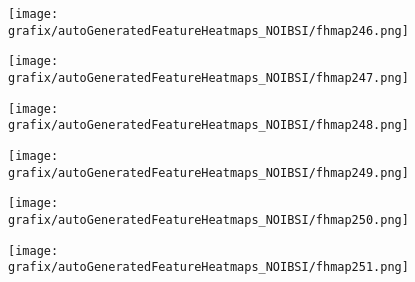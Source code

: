 \hspace{\hsp} 
\begin{subfigure}{\wid\textwidth} 
    \centering 
    \caption{\tiny \sffamily {}} 
    \vspace{\vsp} 
    \texttt{[image: grafix/autoGeneratedFeatureHeatmaps\_NOIBSI/fhmap246.png]} 
\end{subfigure} 
\hspace{\hsp} 
\begin{subfigure}{\wid\textwidth} 
    \centering 
    \caption{\tiny \sffamily {}} 
    \vspace{\vsp} 
    \texttt{[image: grafix/autoGeneratedFeatureHeatmaps\_NOIBSI/fhmap247.png]} 
\end{subfigure} 
\hspace{\hsp} 
\begin{subfigure}{\wid\textwidth} 
    \centering 
    \caption{\tiny \sffamily {}} 
    \vspace{\vsp} 
    \texttt{[image: grafix/autoGeneratedFeatureHeatmaps\_NOIBSI/fhmap248.png]} 
\end{subfigure} 
\hspace{\hsp} 
\begin{subfigure}{\wid\textwidth} 
    \centering 
    \caption{\tiny \sffamily {}} 
    \vspace{\vsp} 
    \texttt{[image: grafix/autoGeneratedFeatureHeatmaps\_NOIBSI/fhmap249.png]} 
\end{subfigure} 
\hspace{\hsp} 
\begin{subfigure}{\wid\textwidth} 
    \centering 
    \caption{\tiny \sffamily {}} 
    \vspace{\vsp} 
    \texttt{[image: grafix/autoGeneratedFeatureHeatmaps\_NOIBSI/fhmap250.png]} 
\end{subfigure} 
\hspace{\hsp} 
\begin{subfigure}{\wid\textwidth} 
    \centering 
    \caption{\tiny \sffamily {}} 
    \vspace{\vsp} 
    \texttt{[image: grafix/autoGeneratedFeatureHeatmaps\_NOIBSI/fhmap251.png]} 
\end{subfigure} 
\hspace{\hsp} 

